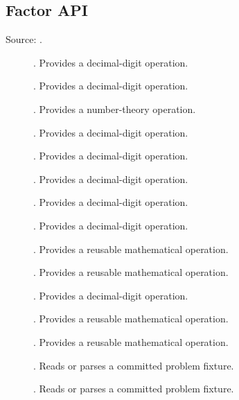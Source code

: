 \subsection{Factor API}
Source: .
\begin{description}
\item[\texttt{}] \texttt{}. Provides a decimal-digit operation.
\item[\texttt{}] \texttt{}. Provides a decimal-digit operation.
\item[\texttt{}] \texttt{}. Provides a number-theory operation.
\item[\texttt{}] \texttt{}. Provides a decimal-digit operation.
\item[\texttt{}] \texttt{}. Provides a decimal-digit operation.
\item[\texttt{}] \texttt{}. Provides a decimal-digit operation.
\item[\texttt{}] \texttt{}. Provides a decimal-digit operation.
\item[\texttt{}] \texttt{}. Provides a decimal-digit operation.
\item[\texttt{}] \texttt{}. Provides a reusable mathematical operation.
\item[\texttt{}] \texttt{}. Provides a reusable mathematical operation.
\item[\texttt{}] \texttt{}. Provides a decimal-digit operation.
\item[\texttt{}] \texttt{}. Provides a reusable mathematical operation.
\item[\texttt{}] \texttt{}. Provides a reusable mathematical operation.
\item[\texttt{}] \texttt{}. Reads or parses a committed problem fixture.
\item[\texttt{}] \texttt{}. Reads or parses a committed problem fixture.

\end{description}
